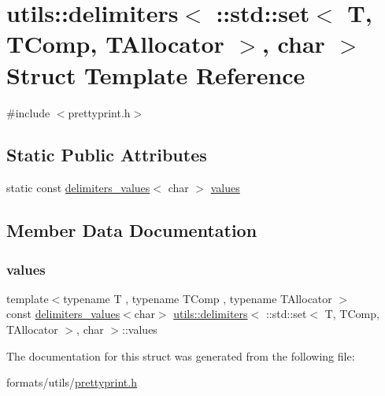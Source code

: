 \hypertarget{structutils_1_1delimiters_3_01_1_1std_1_1set_3_01_t_00_01_t_comp_00_01_t_allocator_01_4_00_01char_01_4}{}\section{utils\+::delimiters$<$ \+::std\+::set$<$ T, T\+Comp, T\+Allocator $>$, char $>$ Struct Template Reference}
\label{structutils_1_1delimiters_3_01_1_1std_1_1set_3_01_t_00_01_t_comp_00_01_t_allocator_01_4_00_01char_01_4}


{\ttfamily \#include $<$prettyprint.\+h$>$}

\subsection*{Static Public Attributes}
\begin{DoxyCompactItemize}
\item 
static const \mbox{\hyperlink{structutils_1_1delimiters__values}{delimiters\+\_\+values}}$<$ char $>$ \mbox{\hyperlink{structutils_1_1delimiters_3_01_1_1std_1_1set_3_01_t_00_01_t_comp_00_01_t_allocator_01_4_00_01char_01_4_aeb1b8a316f01c8730b834786db82b2fd}{values}}
\end{DoxyCompactItemize}


\subsection{Member Data Documentation}
\mbox{\label{structutils_1_1delimiters_3_01_1_1std_1_1set_3_01_t_00_01_t_comp_00_01_t_allocator_01_4_00_01char_01_4_aeb1b8a316f01c8730b834786db82b2fd}} 
\subsubsection{\texorpdfstring{values}{values}}
{\footnotesize\ttfamily template$<$typename T , typename T\+Comp , typename T\+Allocator $>$ \\
const \mbox{\hyperlink{structutils_1_1delimiters__values}{delimiters\+\_\+values}}$<$char$>$ \mbox{\hyperlink{structutils_1_1delimiters}{utils\+::delimiters}}$<$ \+::std\+::set$<$ T, T\+Comp, T\+Allocator $>$, char $>$\+::values\hspace{0.3cm}{\ttfamily [static]}}



The documentation for this struct was generated from the following file\+:\begin{DoxyCompactItemize}
\item 
formats/utils/\mbox{\hyperlink{prettyprint_8h}{prettyprint.\+h}}\end{DoxyCompactItemize}
